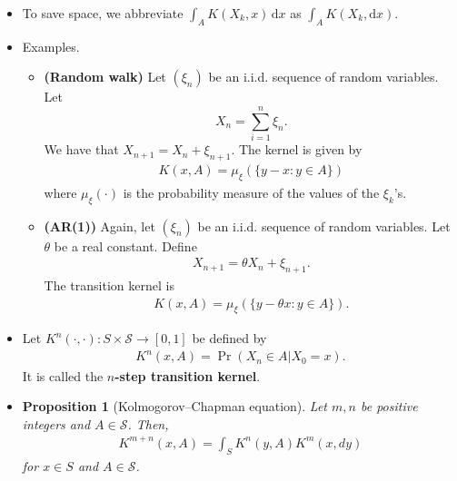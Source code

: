 \documentclass[10pt]{article}
\newtheorem{proposition}[lemma]{Proposition}
\newcommand{\dee}{\mathrm{d}}
\newcommand{\mcal}[1]{\mathcal{#1}}
\begin{document}
\begin{itemize}
  \item To save space, we abbreviate $\int_A K(X_k, x)\, \dee x$ as $\int_A K(X_k, \dee x)$.
  
  \item Examples.
  \begin{itemize}
    \item {\bf (Random walk)} Let $(\xi_n)$ be an i.i.d. sequence of random variables. Let $$X_n = \sum_{i=1}^n \xi_n.$$ We have that $X_{n+1} = X_n + \xi_{n+1}$. The kernel is given by
    \begin{align*}
      K(x,A) = \mu_{\xi}(\{ y - x : y \in A \})
    \end{align*}
    where $\mu_{\xi}(\cdot)$ is the probability measure of the values of the $\xi_k$'s.

    \item {\bf (AR(1))} Again, let $(\xi_n)$ be an i.i.d. sequence of random variables. Let $\theta$ be a real constant. Define
    \begin{align*}
      X_{n+1} = \theta X_{n} + \xi_{n+1}.
    \end{align*}
    The transition kernel is
    \begin{align*}
      K(x, A) = \mu_{\xi}(\{ y - \theta x : y \in A \}).
    \end{align*}
  \end{itemize}

  \item Let $K^n(\cdot,\cdot): S \times \mcal{S} \rightarrow [0,1]$ be defined by
  \begin{align*}
    K^n(x, A) = \Pr(X_n \in A | X_0 = x).
  \end{align*}
  It is called the {\bf $n$-step transition kernel}.  

  \begin{comment}
  \item Moreover, the integral of $f$ with respect to a measure $\mu$ on $X$ can be denoted in several ways.
  \begin{align*}
    \int_X f\, \dee\mu
    = \int_X f(x)\, \dee\mu
    = \int_X f(x)\, \dee\mu(x)
    = \int_X f(x)\mu(\dee x).
  \end{align*}  
  \end{comment}

  \item \begin{proposition}[Kolmogorov--Chapman equation]
    Let $m,n$ be positive integers and $A \in \mcal{S}$. Then,
    \begin{align*}
      K^{m+n}(x, A) = \int_S K^n(y, A) K^m(x, dy)
    \end{align*}
    for $x \in S$ and $A \in \mcal{S}$.
  \end{proposition}


\end{itemize}
\end{document}
